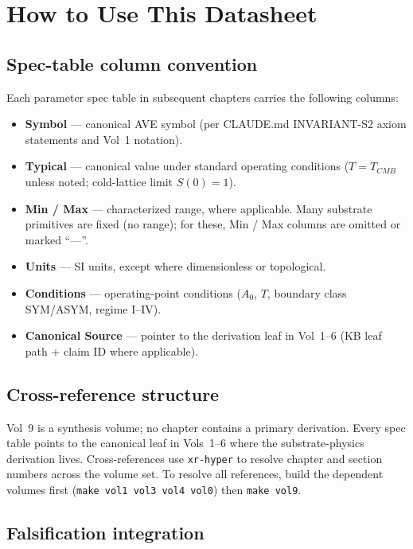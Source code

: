 \section{How to Use This Datasheet}
\label{sec:vol9_how_to_use}

\subsection{Spec-table column convention}

Each parameter spec table in subsequent chapters carries the following columns:

\begin{itemize}
    \item \textbf{Symbol} --- canonical AVE symbol (per CLAUDE.md INVARIANT-S2 axiom statements and Vol~1 notation).
    \item \textbf{Typical} --- canonical value under standard operating conditions ($T = T_{CMB}$ unless noted; cold-lattice limit $S(0) = 1$).
    \item \textbf{Min / Max} --- characterized range, where applicable. Many substrate primitives are fixed (no range); for these, Min / Max columns are omitted or marked ``---''.
    \item \textbf{Units} --- SI units, except where dimensionless or topological.
    \item \textbf{Conditions} --- operating-point conditions ($A_0$, $T$, boundary class SYM/ASYM, regime I--IV).
    \item \textbf{Canonical Source} --- pointer to the derivation leaf in Vol~1--6 (KB leaf path + claim ID where applicable).
\end{itemize}

\subsection{Cross-reference structure}

Vol~9 is a synthesis volume; no chapter contains a primary derivation. Every spec table points to the canonical leaf in Vols~1--6 where the substrate-physics derivation lives. Cross-references use \texttt{xr-hyper} to resolve chapter and section numbers across the volume set. To resolve all references, build the dependent volumes first (\texttt{make vol1 vol3 vol4 vol0}) then \texttt{make vol9}.

\subsection{Falsification integration}

